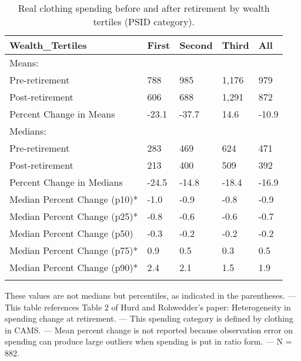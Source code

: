 \begin{table}[tbp] \centering
{}

\caption{Real clothing spending before and after retirement by wealth tertiles (PSID category).}
\begin{tabularx}{\textwidth}{lCCCC}

\toprule
{Wealth\_Tertiles}&{First}&{Second}&{Third}&{All} \tabularnewline
\midrule\addlinespace[1.5ex]
Means:&&&& \tabularnewline
\midrule Pre-retirement&788&985&1,176&979 \tabularnewline
Post-retirement&606&688&1,291&872 \tabularnewline
Percent Change in Means&-23.1&-37.7&14.6&-10.9 \tabularnewline
\midrule Medians:&&&& \tabularnewline
\midrule Pre-retirement&283&469&624&471 \tabularnewline
Post-retirement&213&400&509&392 \tabularnewline
Percent Change in Medians&-24.5&-14.8&-18.4&-16.9 \tabularnewline
Median Percent Change (p10)*&-1.0&-0.9&-0.8&-0.9 \tabularnewline
Median Percent Change (p25)*&-0.8&-0.6&-0.6&-0.7 \tabularnewline
Median Percent Change (p50)&-0.3&-0.2&-0.2&-0.2 \tabularnewline
Median Percent Change (p75)*&0.9&0.5&0.3&0.5 \tabularnewline
Median Percent Change (p90)*&2.4&2.1&1.5&1.9 \tabularnewline
\bottomrule \addlinespace[1.5ex]

\end{tabularx}
\begin{flushleft}
\footnotesize *These values are not medians but percentiles, as indicated in the parentheses. \linebreak --- \linebreak This table references Table 2 of Hurd and Rohwedder's paper: Heterogeneity in spending change at retirement. \linebreak --- \linebreak This spending category is defined by clothing in CAMS. \linebreak --- \linebreak Mean percent change is not reported because observation error on spending can produce large outliers when spending is put in ratio form. \linebreak --- \linebreak N = 882.
\end{flushleft}
\end{table}
